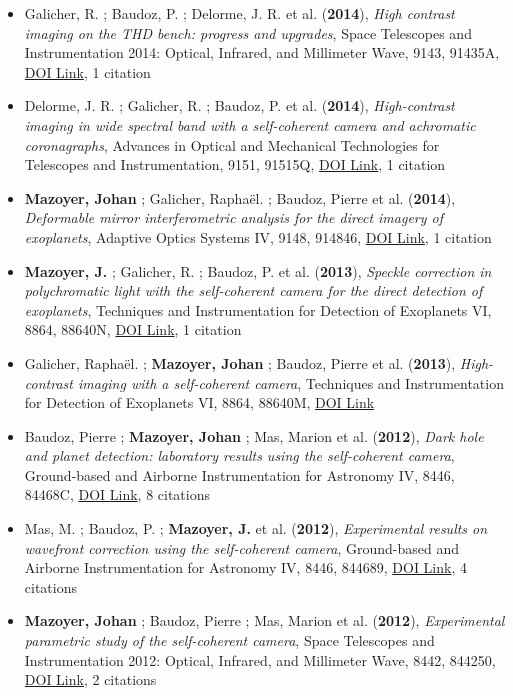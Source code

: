 \documentclass[11pt]{article}
\begin{document}
\begin{itemize}
\item Galicher, R. ; Baudoz, P. ; Delorme, J. R. et al. ({\bf2014}), {\it High contrast imaging on the THD bench: progress and upgrades}, Space Telescopes and Instrumentation 2014: Optical, Infrared, and Millimeter Wave, 9143, 91435A, \href{https://doi.org/10.1117/12.2055902}{DOI Link}, 1 citation

\item Delorme, J. R. ; Galicher, R. ; Baudoz, P. et al. ({\bf2014}), {\it High-contrast imaging in wide spectral band with a self-coherent camera and achromatic coronagraphs}, Advances in Optical and Mechanical Technologies for Telescopes and Instrumentation, 9151, 91515Q, \href{https://doi.org/10.1117/12.2056846}{DOI Link}, 1 citation

\item {\bf Mazoyer, Johan} ; Galicher, Rapha{\"e}l. ; Baudoz, Pierre et al. ({\bf2014}), {\it Deformable mirror interferometric analysis for the direct imagery of exoplanets}, Adaptive Optics Systems IV, 9148, 914846, \href{https://doi.org/10.1117/12.2057833}{DOI Link}, 1 citation

\item {\bf Mazoyer, J.} ; Galicher, R. ; Baudoz, P. et al. ({\bf2013}), {\it Speckle correction in polychromatic light with the self-coherent camera for the direct detection of exoplanets}, Techniques and Instrumentation for Detection of Exoplanets VI, 8864, 88640N, \href{https://doi.org/10.1117/12.2023508}{DOI Link}, 1 citation

\item Galicher, Rapha{\"e}l. ; {\bf Mazoyer, Johan} ; Baudoz, Pierre et al. ({\bf2013}), {\it High-contrast imaging with a self-coherent camera}, Techniques and Instrumentation for Detection of Exoplanets VI, 8864, 88640M, \href{https://doi.org/10.1117/12.2025298}{DOI Link}

\item Baudoz, Pierre ; {\bf Mazoyer, Johan} ; Mas, Marion et al. ({\bf2012}), {\it Dark hole and planet detection: laboratory results using the self-coherent camera}, Ground-based and Airborne Instrumentation for Astronomy IV, 8446, 84468C, \href{https://doi.org/10.1117/12.926575}{DOI Link}, 8 citations

\item Mas, M. ; Baudoz, P. ; {\bf Mazoyer, J.} et al. ({\bf2012}), {\it Experimental results on wavefront correction using the self-coherent camera}, Ground-based and Airborne Instrumentation for Astronomy IV, 8446, 844689, \href{https://doi.org/10.1117/12.926586}{DOI Link}, 4 citations

\item {\bf Mazoyer, Johan} ; Baudoz, Pierre ; Mas, Marion et al. ({\bf2012}), {\it Experimental parametric study of the self-coherent camera}, Space Telescopes and Instrumentation 2012: Optical, Infrared, and Millimeter Wave, 8442, 844250, \href{https://doi.org/10.1117/12.926080}{DOI Link}, 2 citations

\end{itemize}
\end{document}
